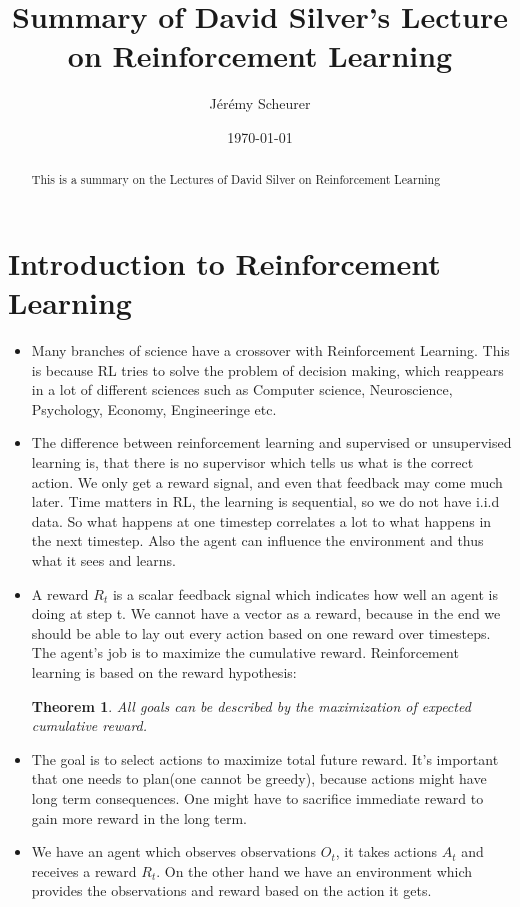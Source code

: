 \documentclass[a4paper]{article}
\title{Summary of David Silver's Lecture on Reinforcement Learning }
\author{Jérémy Scheurer}
\date{\today}
\newtheorem{theorem}{Theorem}
\begin{document}
\maketitle

\begin{abstract}
This is a summary on the Lectures of David Silver on Reinforcement Learning 
\end{abstract}

\section{Introduction to Reinforcement Learning}
\begin{itemize}
\item Many branches of science have a crossover with Reinforcement Learning. This is because RL tries to solve the problem of decision making, which reappears in a lot of different sciences such as Computer science, Neuroscience, Psychology, Economy, Engineeringe etc. 
\item The difference between reinforcement learning and supervised or unsupervised learning is, that there is no supervisor which tells us what is the correct action. We only get a reward signal, and even that feedback may come much later. Time matters in RL, the learning is sequential, so we do not have i.i.d data. So what happens at one timestep correlates a lot to what happens in the next timestep. Also the agent can influence the environment and thus what it sees and learns. 
\item A reward $R_t$ is a scalar feedback signal which indicates how well an agent is doing at step t. We cannot have a vector as a reward, because in the end we should be able to lay out every action based on one reward over timesteps. The agent's job is to maximize the cumulative reward. Reinforcement learning is based on the reward hypothesis:
\begin{theorem} All goals can be described by the maximization of expected cumulative reward.
\end{theorem}
\item The goal is to select actions to maximize total future reward. It's important that one needs to plan(one cannot be greedy), because actions might have long term consequences. One might have to sacrifice immediate reward to gain more reward in the long term. 
\item We have an agent which observes observations $O_t$, it takes actions $A_t$ and receives a reward $R_t$. On the other hand we have an environment which provides the observations and reward based on the action it gets. 

\end{itemize}
\end{document}

